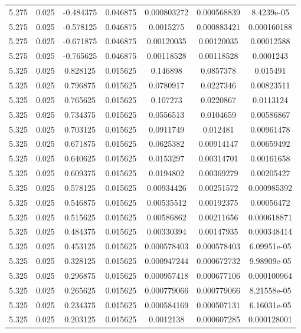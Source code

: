 \begin{flushleft}
\begin{longtable}{ccccccc}
5.275 & 0.025 & -0.484375 & 0.046875 & 0.000803272 & 0.000568839 & 8.4239e-05  \\ 
5.275 & 0.025 & -0.578125 & 0.046875 & 0.0015275 & 0.000883421 & 0.000160188  \\ 
5.275 & 0.025 & -0.671875 & 0.046875 & 0.00120035 & 0.00120035 & 0.00012588  \\ 
5.275 & 0.025 & -0.765625 & 0.046875 & 0.00118528 & 0.00118528 & 0.0001243  \\ 
5.325 & 0.025 & 0.828125 & 0.015625 & 0.146898 & 0.0857378 & 0.015491  \\ 
5.325 & 0.025 & 0.796875 & 0.015625 & 0.0780917 & 0.0227346 & 0.00823511  \\ 
5.325 & 0.025 & 0.765625 & 0.015625 & 0.107273 & 0.0220867 & 0.0113124  \\ 
5.325 & 0.025 & 0.734375 & 0.015625 & 0.0556513 & 0.0104659 & 0.00586867  \\ 
5.325 & 0.025 & 0.703125 & 0.015625 & 0.0911749 & 0.012481 & 0.00961478  \\ 
5.325 & 0.025 & 0.671875 & 0.015625 & 0.0625382 & 0.00914147 & 0.00659492  \\ 
5.325 & 0.025 & 0.640625 & 0.015625 & 0.0153297 & 0.00314701 & 0.00161658  \\ 
5.325 & 0.025 & 0.609375 & 0.015625 & 0.0194802 & 0.00369279 & 0.00205427  \\ 
5.325 & 0.025 & 0.578125 & 0.015625 & 0.00934426 & 0.00251572 & 0.000985392  \\ 
5.325 & 0.025 & 0.546875 & 0.015625 & 0.00535512 & 0.00192375 & 0.00056472  \\ 
5.325 & 0.025 & 0.515625 & 0.015625 & 0.00586862 & 0.00211656 & 0.000618871  \\ 
5.325 & 0.025 & 0.484375 & 0.015625 & 0.00330394 & 0.00147935 & 0.000348414  \\ 
5.325 & 0.025 & 0.453125 & 0.015625 & 0.000578403 & 0.000578403 & 6.09951e-05  \\ 
5.325 & 0.025 & 0.328125 & 0.015625 & 0.000947244 & 0.000672732 & 9.98909e-05  \\ 
5.325 & 0.025 & 0.296875 & 0.015625 & 0.000957418 & 0.000677106 & 0.000100964  \\ 
5.325 & 0.025 & 0.265625 & 0.015625 & 0.000779066 & 0.000779066 & 8.21558e-05  \\ 
5.325 & 0.025 & 0.234375 & 0.015625 & 0.000584169 & 0.000507131 & 6.16031e-05  \\ 
5.325 & 0.025 & 0.203125 & 0.015625 & 0.0012138 & 0.000607285 & 0.000128001  \\ 

\end{longtable}
\end{flushleft}

